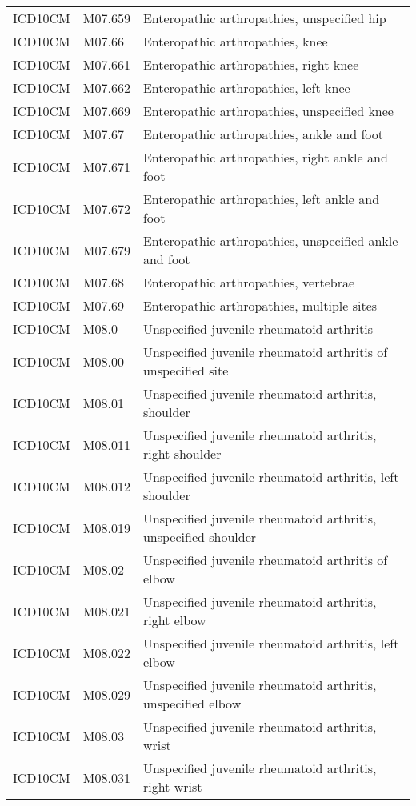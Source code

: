 \begin{longtable}{p{}p{}p{}}
  ICD10CM & M07.659 & Enteropathic arthropathies, unspecified hip \\ 
  ICD10CM & M07.66 & Enteropathic arthropathies, knee \\ 
  ICD10CM & M07.661 & Enteropathic arthropathies, right knee \\ 
  ICD10CM & M07.662 & Enteropathic arthropathies, left knee \\ 
  ICD10CM & M07.669 & Enteropathic arthropathies, unspecified knee \\ 
  ICD10CM & M07.67 & Enteropathic arthropathies, ankle and foot \\ 
  ICD10CM & M07.671 & Enteropathic arthropathies, right ankle and foot \\ 
  ICD10CM & M07.672 & Enteropathic arthropathies, left ankle and foot \\ 
  ICD10CM & M07.679 & Enteropathic arthropathies, unspecified ankle and foot \\ 
  ICD10CM & M07.68 & Enteropathic arthropathies, vertebrae \\ 
  ICD10CM & M07.69 & Enteropathic arthropathies, multiple sites \\ 
  ICD10CM & M08.0 & Unspecified juvenile rheumatoid arthritis \\ 
  ICD10CM & M08.00 & Unspecified juvenile rheumatoid arthritis of unspecified site \\ 
  ICD10CM & M08.01 & Unspecified juvenile rheumatoid arthritis, shoulder \\ 
  ICD10CM & M08.011 & Unspecified juvenile rheumatoid arthritis, right shoulder \\ 
  ICD10CM & M08.012 & Unspecified juvenile rheumatoid arthritis, left shoulder \\ 
  ICD10CM & M08.019 & Unspecified juvenile rheumatoid arthritis, unspecified shoulder \\ 
  ICD10CM & M08.02 & Unspecified juvenile rheumatoid arthritis of elbow \\ 
  ICD10CM & M08.021 & Unspecified juvenile rheumatoid arthritis, right elbow \\ 
  ICD10CM & M08.022 & Unspecified juvenile rheumatoid arthritis, left elbow \\ 
  ICD10CM & M08.029 & Unspecified juvenile rheumatoid arthritis, unspecified elbow \\ 
  ICD10CM & M08.03 & Unspecified juvenile rheumatoid arthritis, wrist \\ 
  ICD10CM & M08.031 & Unspecified juvenile rheumatoid arthritis, right wrist \\ 

\end{longtable}
